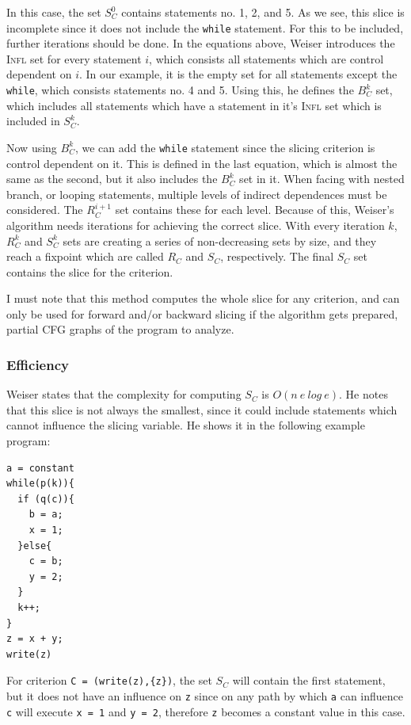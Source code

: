 \documentclass[oneside,12pt,a4paper]{book}
\begin{document}
In this case, the set $S^0_C$ contains statements no. 1, 2, and 5. As we see, this slice is incomplete since it does not include the \texttt{while} statement. For this to be included, further iterations should be done. In the equations above, Weiser introduces the \textsc{Infl} set for every statement $i$, which consists all statements which are control dependent on $i$. In our example, it is the empty set for all statements except the \texttt{while}, which consists statements no. 4 and 5. Using this, he defines the $B^k_C$ set, which includes all statements which have a statement in it's \textsc{Infl} set which is included in $S^k_C$.

Now using $B^k_C$, we can add the \texttt{while} statement since the slicing criterion is control dependent on it. This is defined in the last equation, which is almost the same as the second, but it also includes the $B^k_C$ set in it. When facing with nested branch, or looping statements, multiple levels of indirect dependences must be considered. The $R^{i+1}_C$ set contains these for each level. Because of this, Weiser's algorithm needs iterations for achieving the correct slice. With every iteration $k$, $R^k_C$ and $S^k_C$ sets are creating a series of non-decreasing sets by size, and they reach a fixpoint which are called $R_C$ and $S_C$, respectively. The final $S_C$ set contains the slice for the criterion.

I must note that this method computes the whole slice for any criterion, and can only be used for forward and/or backward slicing if the algorithm gets prepared, partial CFG graphs of the program to analyze.

\subsubsection{Efficiency}
Weiser states that the complexity for computing $S_C$ is $O(n\ e\ log\ e)$. He notes that this slice is not always the smallest, since it could include statements which cannot influence the slicing variable. He shows it in the following example program:
\begin{lstlisting}
a = constant
while(p(k)){
  if (q(c)){
    b = a;
    x = 1;
  }else{
  	c = b;
  	y = 2;
  }
  k++;
}
z = x + y;
write(z)
\end{lstlisting}

For criterion \texttt{C = (write(z),\{z\})}, the set $S_C$ will contain the first statement, but it does not have an influence on \texttt{z} since on any path by which \texttt{a} can influence \texttt{c} will execute \texttt{x = 1} and \texttt{y = 2}, therefore \texttt{z} becomes a constant value in this case. 
\end{document}
